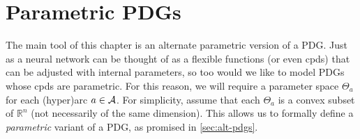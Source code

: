 \section{Parametric PDGs}
The main tool of this chapter is an alternate parametric version of a PDG.
Just as a neural network can be thought of as a flexible functions (or even cpds) that can be adjusted with internal parameters, so too would we like to model PDGs whose cpds are parametric.
For this reason, we
will require a parameter space $\Theta_a$ for each (hyper)arc $a \in \mathcal A$.
For simplicity, assume that each $\Theta_a$ is a convex subset of $\mathbb R^n$ (not necessarily of the same dimension).
%
%
%
This allows us to formally define a \emph{parametric} variant of a PDG, as promised in \cref{sec:alt-pdgs}.


